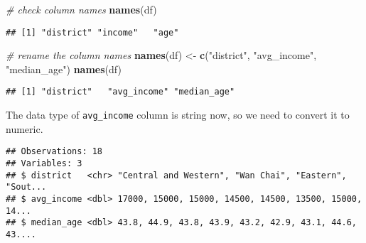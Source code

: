 \documentclass[]{article}
\newenvironment{Shaded}{\begin{snugshade}}{\end{snugshade}}
\newcommand{\CommentTok}[1]{\textcolor[rgb]{0.56,0.35,0.01}{\textit{#1}}}
\newcommand{\KeywordTok}[1]{\textcolor[rgb]{0.13,0.29,0.53}{\textbf{#1}}}
\newcommand{\NormalTok}[1]{#1}
\newcommand{\OperatorTok}[1]{\textcolor[rgb]{0.81,0.36,0.00}{\textbf{#1}}}
\newcommand{\StringTok}[1]{\textcolor[rgb]{0.31,0.60,0.02}{#1}}
\begin{document}
\begin{Shaded}
\begin{Highlighting}[]
\CommentTok{# check column names}
\KeywordTok{names}\NormalTok{(df)}
\end{Highlighting}
\end{Shaded}

\begin{verbatim}
## [1] "district" "income"   "age"
\end{verbatim}

\begin{Shaded}
\begin{Highlighting}[]
\CommentTok{# rename the column names}
\KeywordTok{names}\NormalTok{(df) <-}\StringTok{ }\KeywordTok{c}\NormalTok{(}\StringTok{"district"}\NormalTok{, }\StringTok{"avg_income"}\NormalTok{, }\StringTok{"median_age"}\NormalTok{)}
\KeywordTok{names}\NormalTok{(df)}
\end{Highlighting}
\end{Shaded}

\begin{verbatim}
## [1] "district"   "avg_income" "median_age"
\end{verbatim}

The data type of \texttt{avg\_income} column is string now, so we need
to convert it to numeric.

\begin{Shaded}
\end{Shaded}

\begin{verbatim}
## Observations: 18
## Variables: 3
## $ district   <chr> "Central and Western", "Wan Chai", "Eastern", "Sout...
## $ avg_income <dbl> 17000, 15000, 15000, 14500, 14500, 13500, 15000, 14...
## $ median_age <dbl> 43.8, 44.9, 43.8, 43.9, 43.2, 42.9, 43.1, 44.6, 43....
\end{verbatim}
\end{document}
